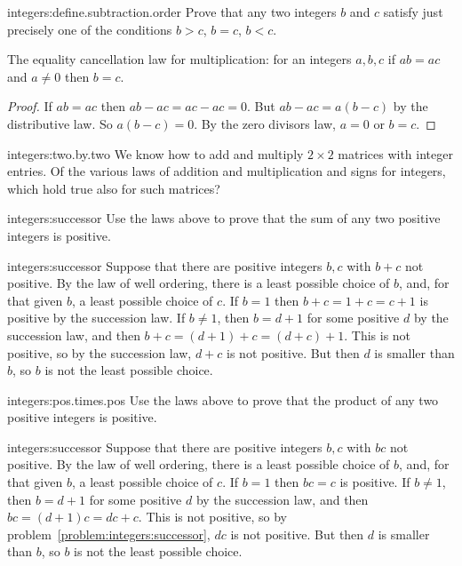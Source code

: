 \begin{problem}{integers:define.subtraction.order}
Prove that any two integers \(b\) and \(c\) satisfy just precisely one of the conditions \(b>c\), \(b=c\), \(b<c\).
\end{problem}
\begin{theorem} The equality cancellation law for multiplication: for an integers \(a,b,c\) if \(ab=ac\) and \(a\ne 0\) then \(b=c\).
\end{theorem}
\begin{proof}
If \(ab=ac\) then \(ab-ac=ac-ac=0\).
But \(ab-ac=a(b-c)\) by the distributive law.
So \(a(b-c)=0\). By the zero divisors law, \(a=0\) or \(b=c\).
\end{proof}
\begin{problem}{integers:two.by.two}
We know how to add and multiply \(2 \times 2\) matrices with integer entries.
Of the various laws of addition and multiplication and signs for integers, which hold true also for such matrices?
\end{problem}
\begin{problem}{integers:successor}
Use the laws above to prove that the sum of any two positive integers is positive.
\end{problem}
\begin{answer}{integers:successor}
Suppose that there are positive integers \(b,c\) with \(b+c\) not positive.
By the law of well ordering, there is a least possible choice of \(b\), and, for that given \(b\), a least possible choice of \(c\).
If \(b=1\) then \(b+c=1+c=c+1\) is positive by the succession law.
If \(b \ne 1\), then \(b=d+1\) for some positive \(d\) by the succession law, and then \(b+c=(d+1)+c=(d+c)+1\).
This is not positive, so by the succession law, \(d+c\) is not positive.
But then \(d\) is smaller than \(b\), so \(b\) is not the least possible choice.
\end{answer}
\begin{problem}{integers:pos.times.pos}
Use the laws above to prove that the product of any two positive integers is positive.
\end{problem}
\begin{answer}{integers:successor}
Suppose that there are positive integers \(b,c\) with \(bc\) not positive.
By the law of well ordering, there is a least possible choice of \(b\), and, for that given \(b\), a least possible choice of \(c\).
If \(b=1\) then \(bc=c\) is positive.
If \(b \ne 1\), then \(b=d+1\) for some positive \(d\) by the succession law, and then \(bc=(d+1)c=dc+c\).
This is not positive, so by problem~\vref{problem:integers:successor}, \(dc\) is not positive.
But then \(d\) is smaller than \(b\), so \(b\) is not the least possible choice.
\end{answer}
